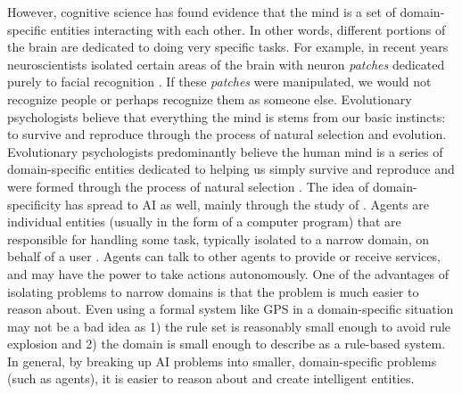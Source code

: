However, cognitive science has found evidence that the mind is a set of domain-specific entities interacting with each other. In other words, different portions of the brain are dedicated to doing very specific tasks. For example, in recent years neuroscientists isolated certain areas of the brain with neuron \textit{patches} dedicated purely to facial recognition \citep{buchen:patchesforface}. If these \textit{patches} were manipulated, we would not recognize people or perhaps recognize them as someone else. Evolutionary psychologists believe that everything the mind is stems from our basic instincts: to survive and reproduce through the process of natural selection and evolution. Evolutionary psychologists predominantly believe the human mind is a series of domain-specific entities dedicated to helping us simply survive and reproduce and were formed through the process of natural selection \citep{cosmides:invisiblehand,cosmides:originsofdomainspecific}. The idea of domain-specificity has spread to AI as well, mainly through the study of . Agents are individual entities (usually in the form of a computer program) that are responsible for handling some task, typically isolated to a narrow domain, on behalf of a user \citep{russellnorvig:ai, minksy:societyofmind}. Agents can talk to other agents to provide or receive services, and may have the power to take actions autonomously. One of the advantages of isolating problems to narrow domains is that the problem is much easier to reason about. Even using a formal system like GPS in a domain-specific situation may not be a bad idea as 1) the rule set is reasonably small enough to avoid rule explosion and 2) the domain is small enough to describe as a rule-based system. In general, by breaking up AI problems into smaller, domain-specific problems (such as agents), it is easier to reason about and create intelligent entities.

